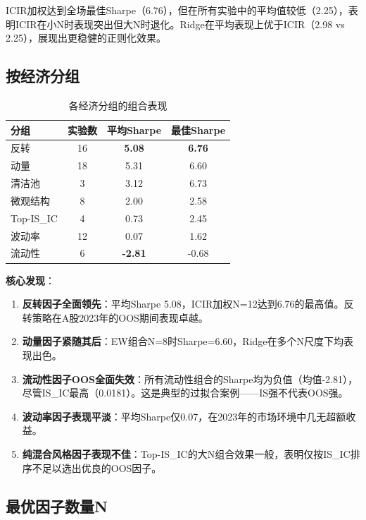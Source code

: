 \documentclass[11pt,a4paper]{ctexart}
\begin{document}
ICIR加权达到全场最佳Sharpe（6.76），但在所有实验中的平均值较低（2.25），表明ICIR在小N时表现突出但大N时退化。Ridge在平均表现上优于ICIR（2.98 vs 2.25），展现出更稳健的正则化效果。

\subsection{按经济分组}

\begin{table}[H]
\centering
\caption{各经济分组的组合表现}
\begin{tabular}{lccc}
\toprule
\textbf{分组} & \textbf{实验数} & \textbf{平均Sharpe} & \textbf{最佳Sharpe} \\
\midrule
反转         & 16 & \textbf{5.08} & \textbf{6.76} \\
动量         & 18 & 5.31 & 6.60 \\
清洁池       & 3  & 3.12 & 6.73 \\
微观结构     & 8  & 2.00 & 2.58 \\
Top-IS\_IC  & 4  & 0.73 & 2.45 \\
波动率       & 12 & 0.07 & 1.62 \\
流动性       & 6  & \textbf{-2.81} & -0.68 \\
\bottomrule
\end{tabular}
\end{table}

\textbf{核心发现}：
\begin{enumerate}[nosep]
    \item \textbf{反转因子全面领先}：平均Sharpe 5.08，ICIR加权N=12达到6.76的最高值。反转策略在A股2023年的OOS期间表现卓越。
    \item \textbf{动量因子紧随其后}：EW组合N=8时Sharpe=6.60，Ridge在多个N尺度下均表现出色。
    \item \textbf{流动性因子OOS全面失效}：所有流动性组合的Sharpe均为负值（均值-2.81），尽管IS\_IC最高（0.0181）。这是典型的过拟合案例——IS强不代表OOS强。
    \item \textbf{波动率因子表现平淡}：平均Sharpe仅0.07，在2023年的市场环境中几无超额收益。
    \item \textbf{纯混合风格因子表现不佳}：Top-IS\_IC的大N组合效果一般，表明仅按IS\_IC排序不足以选出优良的OOS因子。
\end{enumerate}

\subsection{最优因子数量N}
\end{document}
